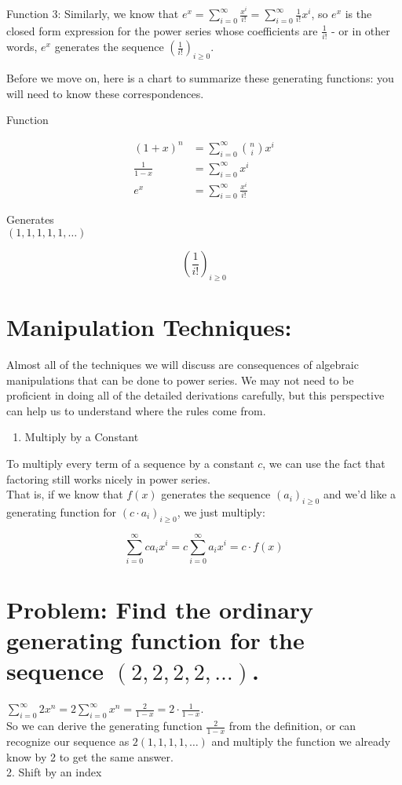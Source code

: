 \documentclass{article}
\begin{document}
Function 3: Similarly, we know that $e^{x}=\sum_{i=0}^{\infty} \frac{x^{i}}{i!}=\sum_{i=0}^{\infty} \frac{1}{i!} x^{i}$, so $e^{x}$ is the closed form expression for the power series whose coefficients are $\frac{1}{i!}$ - or in other words, $e^{x}$ generates the sequence $\left(\frac{1}{i!}\right)_{i \geq 0}$.

Before we move on, here is a chart to summarize these generating functions: you will need to know these correspondences.

Function

$$
\begin{aligned}
(1+x)^{n} & =\sum_{i=0}^{\infty}\binom{n}{i} x^{i} \\
\frac{1}{1-x} & =\sum_{i=0}^{\infty} x^{i} \\
e^{x} & =\sum_{i=0}^{\infty} \frac{x^{i}}{i!}
\end{aligned}
$$

Generates\\
$(1,1,1,1,1, \ldots)$

$$
\left(\frac{1}{i!}\right)_{i \geq 0}
$$

\section*{Manipulation Techniques:}
Almost all of the techniques we will discuss are consequences of algebraic manipulations that can be done to power series. We may not need to be proficient in doing all of the detailed derivations carefully, but this perspective can help us to understand where the rules come from.

\begin{enumerate}
  \item Multiply by a Constant
\end{enumerate}

To multiply every term of a sequence by a constant $c$, we can use the fact that factoring still works nicely in power series.\\
That is, if we know that $f(x)$ generates the sequence $\left(a_{i}\right)_{i \geq 0}$ and we'd like a generating function for $\left(c \cdot a_{i}\right)_{i \geq 0}$, we just multiply:

$$
\sum_{i=0}^{\infty} c a_{i} x^{i}=c \sum_{i=0}^{\infty} a_{i} x^{i}=c \cdot f(x)
$$

\section*{Problem: Find the ordinary generating function for the sequence $(2,2,2,2, \ldots)$.}
$\sum_{i=0}^{\infty} 2 x^{n}=2 \sum_{i=0}^{\infty} x^{n}=\frac{2}{1-x}=2 \cdot \frac{1}{1-x}$.\\
So we can derive the generating function $\frac{2}{1-x}$ from the definition, or can recognize our sequence as $2(1,1,1,1, \ldots)$ and multiply the function we already know by 2 to get the same answer.\\
2. Shift by an index
\end{document}
